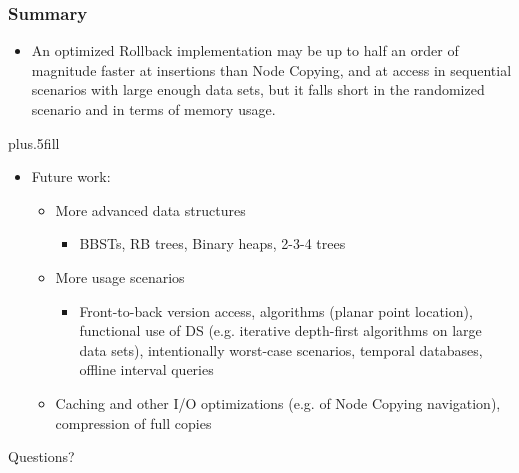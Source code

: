 \documentclass{beamer}
\begin{document}
\begin{frame}
\frametitle<presentation>{Summary}

\begin{itemize}

  \item An optimized Rollback implementation may be up to half an order of
  magnitude faster at insertions than Node Copying, and at access in sequential
  scenarios with large enough data sets, but it falls short in the randomized
  scenario and in terms of memory usage.

\end{itemize}

\pause

\vskip0pt plus.5fill
\begin{itemize}
  \item Future work:
  \begin{itemize}

    \item More advanced data structures

    \begin{itemize}

      \item BBSTs, RB trees, Binary heaps, 2-3-4 trees

    \end{itemize}

\pause
    \item More usage scenarios

    \begin{itemize}

      \item Front-to-back version access, algorithms (planar point location),
      functional use of DS (e.g. iterative depth-first algorithms on large data
      sets), intentionally worst-case scenarios, temporal databases, offline
      interval queries

    \end{itemize}

\pause
    \item Caching and other I/O optimizations (e.g. of Node Copying navigation),
    compression of full copies

  \end{itemize}
\end{itemize}
\end{frame}

\bgroup
{}
\begin{frame}[plain]{}
\center
\Huge
Questions?
\end{frame}
\egroup
\end{document}
